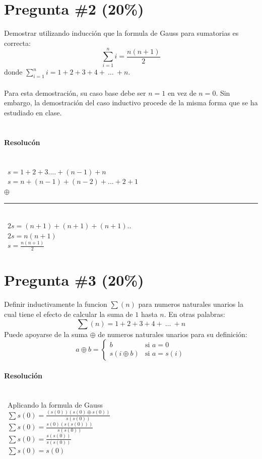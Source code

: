 \documentclass{article}
\begin{document}
\begin{itemize}
\section*{Pregunta \#2 (20\%)}
Demostrar utilizando inducci\'on que la formula de Gauss para sumatorias es correcta:
\[
        \sum_{i=1}^{n}{i}=\frac{n(n+1)}{2}
\]
donde $\sum_{i=1}^{n}i=1+2+3+4+\ \ldots\ +n$.
\\\\
Para esta demostraci\'on, su caso base debe ser
$n=1$ en vez de $n=0$. Sin embargo, la demostraci\'on
del caso inductivo procede de la misma forma que
se ha estudiado en clase.
\ \\ \ \paragraph{Resoluc\'on}
\ \\ \ $ s = 1+2+3.... + (n-1) +n $
\ \\ \ $s= n+(n-1)+(n-2)+...+2+1$
\ \\ $\oplus$\rule[0mm]{40mm}{0.1mm}
\ \\ \ $2s=(n+1)+(n+1)+(n+1)..$
\ \\ \ $2s=n(n+1)$
\ \\ \ $s=\frac{n(n+1)}{2}$

\section*{Pregunta \#3 (20\%)}
Definir inductivamente la funcion $\sum(n)$ para numeros naturales unarios la cual tiene
el efecto de calcular la suma de $1$ hasta $n$. En otras palabras:
\[
        \sum(n)=1+2+3+4+\ \ldots\ +n
\]
Puede apoyarse de la suma $\oplus$ de numeros naturales unarios para su definici\'on:
\[
        a\oplus b =
                \left\{
                        \begin{array}{ll}
                                b  & \mbox{si } a = 0 \\
                                s(i\oplus b) & \mbox{si } a = s(i)
                        \end{array}
                \right.
\]
\paragraph{Resoluci\'on}
\ \\ \ Aplicando la formula de Gauss
\ \\ \ $\sum s(0)= \frac{(s(0))(s(0)\oplus s(0))}{s(s(0))}$
\ \\ \ $\sum s(0)= \frac{s(0)(s(s(0)))}{s(s(0))}$
\ \\ \ $\sum s(0)= \frac{s(s(0))}{s(s(0))}$
\ \\ \ $\sum s(0)= s(0)$

\end{itemize}
\end{document}
